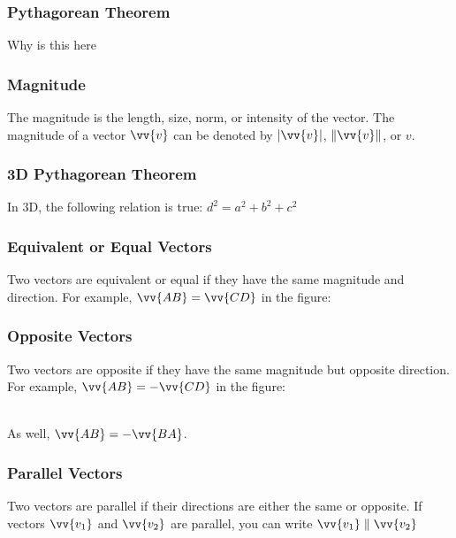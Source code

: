 \documentclass{article}
\begin{document}
	\subsubsection{Pythagorean Theorem}
	Why is this here
	\subsubsection{Magnitude}
	The magnitude is the length, size, norm, or intensity of the vector. The magnitude of a vector $\vv{v}$ can be denoted by $|\vv{v}|$, $\lVert\vv{v}\rVert$, or $v$.
	\subsubsection{3D Pythagorean Theorem}
	In 3D, the following relation is true: $d^2=a^2+b^2+c^2$
	\subsubsection{Equivalent or Equal Vectors}
	Two vectors are equivalent or equal if they have the same magnitude and direction. For example, $\vv{AB}=\vv{CD}$ in the figure:\\
	\subsubsection{Opposite Vectors}
	Two vectors are opposite if they have the same magnitude but opposite direction. For example, $\vv{AB}=-\vv{CD}$ in the figure:\\
	\\
	As well, $\vv{AB}=-\vv{BA}$.
	\subsubsection{Parallel Vectors}
	Two vectors are parallel if their directions are either the same or opposite. If vectors $\vv{v_1}$ and $\vv{v_2}$ are parallel, you can write $\vv{v_1}\parallel\vv{v_2}$\\
\end{document}
